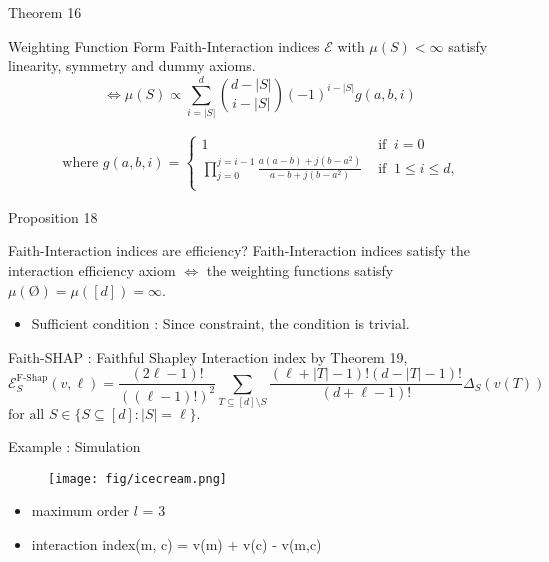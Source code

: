 \documentclass[10pt]{beamer}
\newcommand{\f}{v}
\def\Expl{\mathcal{E}}
\begin{document}
\begin{frame}{Theorem 16}
    \begin{mytheorembox}{Weighting Function Form}
        Faith-Interaction indices $\Expl$ with $\mu(S) < \infty$ satisfy linearity, symmetry and dummy axioms.
        \vspace{1em}
        \[ \iff
        \mu(S) \propto \sum_{i=|S|}^{d} \binom{d- |S|}{i-|S|}(-1)^{i-|S|} g(a,b,i) 
        \]

    \end{mytheorembox}
    \begin{align*}
        \text{ where }
        g(a,b,i) =
        \begin{cases}
            1 & \text{ if } \ i = 0 \\
            \prod_{j=0}^{j=i-1} \frac{a(a-b) + j(b-a^2)}{a-b + j(b-a^2)}
            & \text{ if } \   1 \leq i \leq d,\\
        \end{cases}
    \end{align*}
\end{frame}
\begin{frame}{Proposition 18}
    \begin{myaxiombox}{Faith-Interaction indices are efficiency?}
        Faith-Interaction indices satisfy the interaction efficiency axiom $\iff$
        the weighting functions satisfy $\mu(\text{\O}) = \mu([d]) = \infty$.
    \end{myaxiombox}
    \begin{itemize}[label=\scalebox{0.5}{$\blacksquare$}]
        \item Sufficient condition : Since constraint, the condition is trivial.
    \end{itemize}
\end{frame}
\begin{frame}{Faith-SHAP : Faithful Shapley Interaction index}
    by Theorem 19,
    \begin{equation*}
    \label{eqn:faith_shapley_highest_order}
    \Expl_S^{\text{F-Shap}}(\f,\ell) = \frac{(2\ell -1)!}{((\ell-1)!)^2}
    \sum_{T \subseteq [d] \setminus S}\frac{(\ell+|T|-1)!(d-|T|-1)!}{(d+\ell-1)!}   \Delta_S(\f(T))
    \ \ 
    \end{equation*}
    $\text{for all } S \in \{ S \subseteq [d] : |S| = \ell \}.$
\end{frame}
\begin{frame}{Example : Simulation}
    \begin{figure}
    \centering
    \texttt{[image: fig/icecream.png]}
    \end{figure}
    \begin{itemize}[label=\scalebox{0.5}{$\blacksquare$}]
        \item maximum order $l$ = 3
        \item interaction index(m, c) = v(m) + v(c) - v(m,c)
    \end{itemize}
    
\end{frame}
\end{document}
